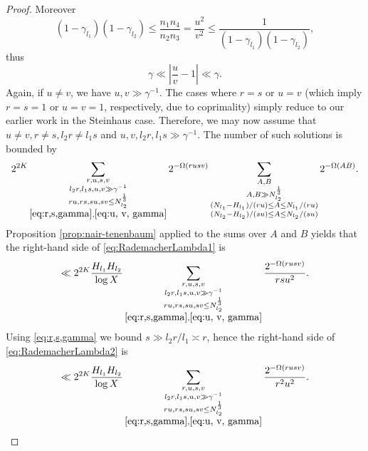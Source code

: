 \documentclass[11pt]{tran-l}
\theoremstyle{definition}
\theoremstyle{remark}
\numberwithin{equation}{section}
\begin{document}
\begin{proof}
    Moreover
    \begin{equation*}
        (1-\gamma_{l_1})(1-\gamma_{l_2})\leq \frac{n_1n_4}{n_2n_3} = \frac{u^2}{v^2}\leq \frac{1}{(1-\gamma_{l_1})(1-\gamma_{l_2})},
    \end{equation*} thus 
    \begin{equation}
        \label{eq:u, v, gamma}
        \gamma \ll \left\lvert \frac{u}{v}-1\right\rvert\ll \gamma.
    \end{equation}
    Again, if $u\neq v$, we have $u, v\gg \gamma^{-1}$. The cases where $r=s$ or $u=v$ (which imply $r=s=1$ or $u=v=1$, respectively, due to coprimality) simply reduce to our earlier work in the Steinhaus case. Therefore, we may now assume that $u\neq v, r\neq s, l_2r\neq l_1s$ and $u, v, l_2r, l_1s\gg\gamma^{-1}$. The number of such solutions is bounded by 
    \begin{equation}\label{eq:RademacherLambda1}
        2^{2K}\sum_{\substack{r, u, s, v \\ l_2r, l_1s, u, v\gg \gamma^{-1} \\ ru, rs, su, sv\leq N_{l_2}^{\frac{1}{3}} \\ \eqref{eq:r,s,gamma}, \eqref{eq:u, v, gamma}}} 2^{-\Omega(rusv)}\sum_{\substack{A, B\\ A, B\gg N_{l_2}^{\frac{1}{3}} \\ (N_{l_1} - H_{l_1})/(ru) \leq A\leq  N_{l_1}/(ru) \\ (N_{l_2} - H_{l_2})/(su)\leq A\leq  N_{l_2}/(su)}} 2^{-\Omega(AB)}.
    \end{equation}
Proposition \ref{prop:nair-tenenbaum} applied  to the sums over $A$ and $B$ yields that the right-hand side of  \eqref{eq:RademacherLambda1} is
     \begin{equation}
         \label{eq:RademacherLambda2}
         \ll 2^{2K}\frac{H_{l_1}H_{l_2}}{\log X} \sum_{\substack{r, u, s, v \\ l_2r, l_1s, u, v\gg \gamma^{-1} \\ ru, rs, su, sv\leq N_{l_2}^{\frac{1}{3}} \\ \eqref{eq:r,s,gamma}, \eqref{eq:u, v, gamma}}} \frac{2^{-\Omega(rusv)}}{rsu^2}.
     \end{equation}
     Using \eqref{eq:r,s,gamma} we bound $s\gg l_2r/l_1\asymp r$, hence the right-hand side of       \eqref{eq:RademacherLambda2} is 
\begin{equation}\label{eq:RademacherLambda3}
    \ll 2^{2K}\frac{H_{l_1}H_{l_2}}{\log X} \sum_{\substack{r, u, s, v \\ l_2r, l_1s, u, v\gg \gamma^{-1} \\ ru, rs, su, sv\leq N_{l_2}^{\frac{1}{3}} \\ \eqref{eq:r,s,gamma}, \eqref{eq:u, v, gamma}}} \frac{2^{-\Omega(rusv)}}{r^2u^2}.

\end{equation}
\end{proof}
\end{document}
